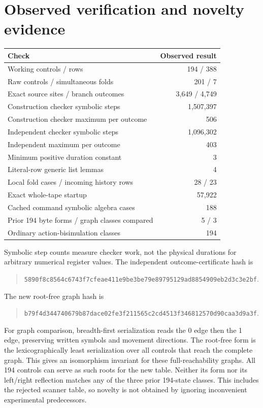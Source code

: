 \documentclass[11pt,letterpaper]{article}
\begin{document}
\section{Observed verification and novelty evidence}

\begin{center}
\begin{tabularx}{\linewidth}{@{}Xr@{}}
\toprule
Check & Observed result\\
\midrule
Working controls / rows &194 / 388\\
Raw controls / simultaneous folds &201 / 7\\
Exact source sites / branch outcomes &3,649 / 4,749\\
Construction checker symbolic steps &1,507,397\\
Construction checker maximum per outcome &506\\
Independent checker symbolic steps &1,096,302\\
Independent maximum per outcome &403\\
Minimum positive duration constant &3\\
Literal-row generic list lemmas &4\\
Local fold cases / incoming history rows &28 / 23\\
Exact whole-tape startup &57,922\\
Cached command symbolic algebra cases &188\\
Prior 194 byte forms / graph classes compared &5 / 3\\
Ordinary action-bisimulation classes &194\\
\bottomrule
\end{tabularx}
\end{center}

Symbolic step counts measure checker work, not the physical durations for
arbitrary numerical register values. The independent outcome-certificate hash is
\begin{quote}\small\nolinkurl{5890f8c8564c6743f7cfeae411e9be3be79e89795129ad8854909eb2d3c3e2bf}.\end{quote}
The new root-free graph hash is
\begin{quote}\small\nolinkurl{b79f4d344740679b87dace02fe3f211565c2cd4513f346812570d90caa3d9a3f}.\end{quote}

For graph comparison, breadth-first serialization reads the 0 edge then the
1 edge, preserving written symbols and movement directions. The root-free form
is the lexicographically least serialization over all controls that reach the
complete graph. This gives an isomorphism invariant for these full-reachability
graphs. All 194 controls can serve as such roots for the new table. Neither
its form nor its left/right reflection matches any of the three prior
194-state classes. This includes the rejected scanner table, so novelty is
not obtained by ignoring inconvenient experimental predecessors.
\end{document}
